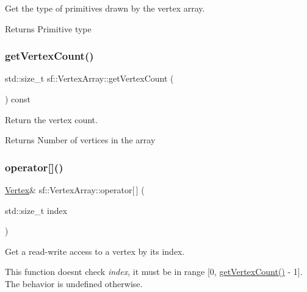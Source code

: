 Get the type of primitives drawn by the vertex array. 

\begin{DoxyReturn}{Returns}
Primitive type 
\end{DoxyReturn}
\mbox{\label{classsf_1_1_vertex_array_abda90e8d841a273d93164f0c0032bd8d}} 
\subsubsection{\texorpdfstring{get\+Vertex\+Count()}{getVertexCount()}}
{\footnotesize\ttfamily std\+::size\+\_\+t sf\+::\+Vertex\+Array\+::get\+Vertex\+Count (\begin{DoxyParamCaption}{ }\end{DoxyParamCaption}) const}



Return the vertex count. 

\begin{DoxyReturn}{Returns}
Number of vertices in the array 
\end{DoxyReturn}
\mbox{\label{classsf_1_1_vertex_array_a6006676417d91f42d0278f1abcfe4352}} 
\subsubsection{\texorpdfstring{operator[]()}{operator[]()}\hspace{0.1cm}{\footnotesize\ttfamily [1/2]}}
{\footnotesize\ttfamily \hyperlink{classsf_1_1_vertex}{Vertex}\& sf\+::\+Vertex\+Array\+::operator\mbox{[}$\,$\mbox{]} (\begin{DoxyParamCaption}\item[{std\+::size\+\_\+t}]{index }\end{DoxyParamCaption})}



Get a read-\/write access to a vertex by its index. 

This function doesn\textquotesingle{}t check {\itshape index}, it must be in range \mbox{[}0, \hyperlink{classsf_1_1_vertex_array_abda90e8d841a273d93164f0c0032bd8d}{get\+Vertex\+Count()} -\/ 1\mbox{]}. The behavior is undefined otherwise.


